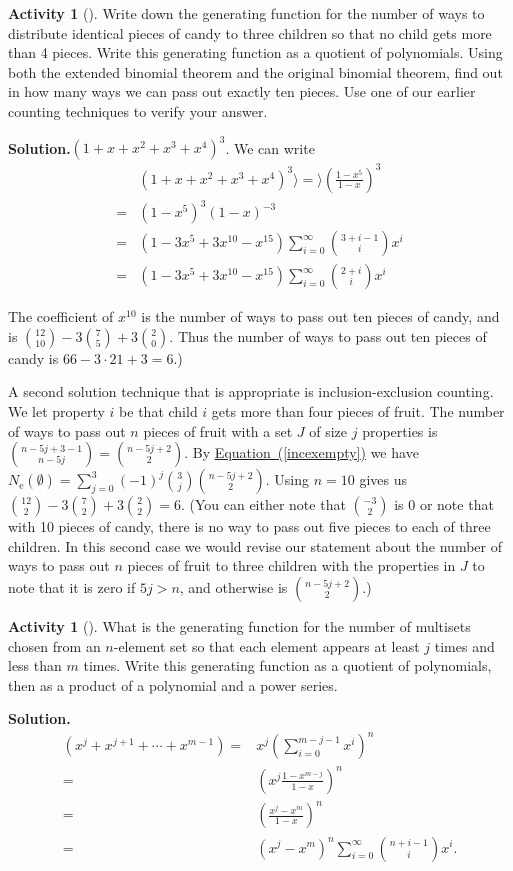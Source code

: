 \documentclass[10pt,]{book}
\theoremstyle{plain}
\theoremstyle{definition}
\newtheorem{activity}[project]{Activity}
\numberwithin{equation}{chapter}
\newcommand{\amp}{&}
\begin{document}
\begin{activity}[]\label{activity-171}
Write down the generating function for the number of ways to distribute identical pieces of candy to three children so that no child gets more than 4 pieces. Write this generating function as a quotient of polynomials. Using both the extended binomial theorem and the original binomial theorem, find out in how many ways we can pass out exactly ten pieces. Use one of our earlier counting techniques to verify your answer.%
\par\medskip\noindent%
\textbf{Solution.}\quad \((1+x+x^2+x^3+x^4)^3\). We can write%
\begin{align*}
\amp (1+x+x^2+x^3+x^4)^3 \rangle =\rangle \left(\frac{1-x^5}{1-x}\right)^3\\
=\amp (1-x^5)^3(1-x)^{-3}\\
=\amp (1-3x^5+3x^{10}-x^{15})\sum_{i=0}^\infty \binom{3+i-1}{i}x^i\\
=\amp (1-3x^5+3x^{10}-x^{15})\sum_{i=0}^\infty \binom{2+i}{i}x^i
\end{align*}
%
\par
The coefficient of \(x^{10}\) is the number of ways to pass out ten pieces of candy, and is \(\binom{12}{10}-3\binom{7}{5} +3\binom{2}{0}\).  Thus the number of ways to pass out ten pieces of candy is \(66-3\cdot21+3=6\).)%
\par
A second solution technique that is appropriate is inclusion-exclusion counting. We let property \(i\) be that child \(i\) gets more than four pieces of fruit. The number of ways to pass out \(n\) pieces of fruit with a set \(J\) of size \(j\) properties is \(\binom{n-5j+3-1}{n-5j}=\binom{n-5j+2}{2}\). By \hyperref[incexempty]{Equation~(\ref{incexempty})} we have \(N_{\mbox{e} }(\emptyset) = \sum_{j=0}^3 (-1)^j\binom{3}{j}\binom{n-5j+2}{2}\). Using \(n=10\) gives us \(\binom{12}{2}-3\binom{7}{2} +3\binom{2}{2} =6.\) (You can either note that \(\binom{-3}{2}\) is 0 or note that with 10 pieces of candy, there is no way to pass out five pieces to each of three children. In this second case we would revise our statement about the number of ways to pass out \(n\) pieces of fruit to three children with the properties in \(J\) to note that it is zero if \(5j>n\), and otherwise is \(\binom{n-5j+2}{2}\).)%
\end{activity}
\begin{activity}[]\label{activity-172}
What is the generating function for the number of multisets chosen from an \(n\)-element set so that each element appears at least \(j\) times and less than \(m\) times. Write this generating function as a quotient of polynomials, then as a product of a polynomial and a power series.%
\par\medskip\noindent%
\textbf{Solution.}\quad %
\begin{align*}
(x^j+x^{j+1}+\cdots+x^{m-1}) =\amp x^j
\left(\sum_{i=0}^{m-j-1}x^i\right)^n\\
=\amp
\left(x^j\frac{1-x^{m-j}}{1-x}\right)^n\\
=\amp \left(\frac{x^j-x^m}{1-x}\right)^n\\
=\amp  (x^j-x^m)^n\sum_{i=0}^\infty \binom{n+i-1}{i}x^i.
\end{align*}
%
\end{activity}
\end{document}
